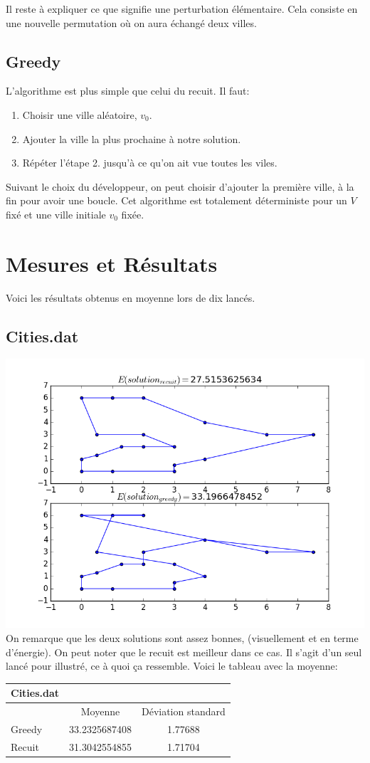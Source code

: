 \documentclass[a4paper, 11pt]{article}
\begin{document}
Il reste à expliquer ce que signifie une perturbation élémentaire. Cela consiste en une nouvelle permutation où on aura échangé deux 
villes.

\subsection{Greedy}
L'algorithme est plus simple que celui du recuit.
Il faut:
\begin{enumerate}
 \item Choisir une ville aléatoire, $v_0$.
 \item Ajouter la ville la plus prochaine à notre solution.
 \item Répéter l'étape 2. jusqu'à ce qu'on ait vue toutes les viles.
\end{enumerate}

Suivant le choix du développeur, on peut choisir d'ajouter la première ville, à la fin pour avoir une boucle.
Cet algorithme est totalement déterministe pour un $V$ fixé et une ville initiale $v_0$ fixée.

\section{Mesures et Résultats}
Voici les résultats obtenus en moyenne lors de dix lancés.

\subsection{Cities.dat}
\includegraphics[scale=0.75]{best}
On remarque que les deux solutions sont assez bonnes, (visuellement et en terme d'énergie). On peut noter que le recuit est meilleur dans 
ce cas.
Il s'agit d'un seul lancé pour illustré, ce à quoi ça ressemble. Voici le tableau avec la moyenne:\\
\begin{tabular}{|l | c |c |}
\hline
Cities.dat & & \\
\hline
  & Moyenne & Déviation standard\\
 \hline
Greedy & 33.2325687408	& 1.77688\\
\hline
Recuit & 31.3042554855	 & 1.71704\\
\hline
\end{tabular}
\end{document}
